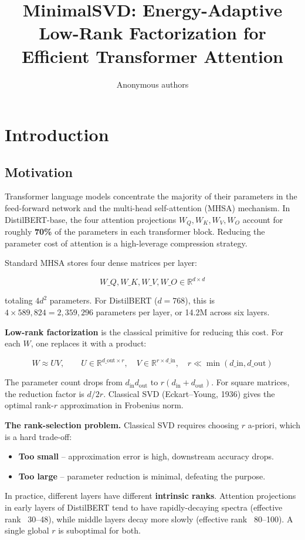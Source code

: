 \title{\textbf{MinimalSVD: Energy-Adaptive Low-Rank Factorization for Efficient Transformer Attention}}

\author{Anonymous authors}



\section{Introduction}

\subsection{Motivation}

Transformer language models concentrate the majority of their parameters in 
the feed-forward network and the multi-head self-attention (MHSA) mechanism. 
In DistilBERT-base, the four attention projections $W_Q, W_K, W_V, W_O$ 
account for roughly \textbf{70\%} of the parameters in each transformer block. 
Reducing the parameter cost of attention is a high-leverage compression 
strategy.

Standard MHSA stores four dense matrices per layer:

\[
W\_Q, W\_K, W\_V, W\_O \in \mathbb{R}^{d \times d}
\tag{1.1}
\]

totaling $4 d^2$ parameters. For DistilBERT ($d = 768$), this is 
$4 \times 589{,}824 = 2{,}359{,}296$ parameters per layer, or 14.2M across 
six layers.

\textbf{Low-rank factorization} is the classical primitive for reducing this cost. 
For each $W$, one replaces it with a product:

\[
W \approx U V, \qquad
U \in \mathbb{R}^{d\_\text{out} \times r}, \quad
V \in \mathbb{R}^{r \times d\_\text{in}}, \quad r \ll \min(d\_\text{in}, d\_\text{out})
\tag{1.2}
\]

The parameter count drops from $d_\text{in} d_\text{out}$ to 
$r(d_\text{in} + d_\text{out})$. For square matrices, the reduction factor is 
$d / 2r$. Classical SVD (Eckart--Young, 1936) gives the optimal rank-$r$ 
approximation in Frobenius norm.

\textbf{The rank-selection problem.} Classical SVD requires choosing $r$ 
a-priori, which is a hard trade-off:

\begin{itemize}
\item \textbf{Too small} -- approximation error is high, downstream accuracy drops.
\item \textbf{Too large} -- parameter reduction is minimal, defeating the purpose.

\end{itemize}
In practice, different layers have different \textbf{intrinsic ranks}. Attention 
projections in early layers of DistilBERT tend to have rapidly-decaying 
spectra (effective rank ~30--48), while middle layers decay more slowly 
(effective rank ~80--100). A single global $r$ is suboptimal for both.


